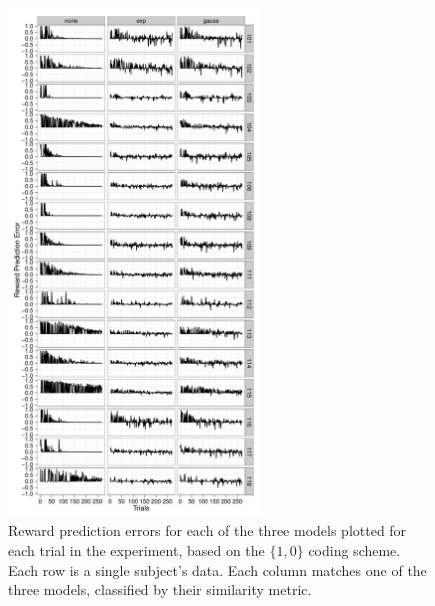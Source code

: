 \begin{figure}[tp]
    \includegraphics[width=0.6\textwidth]{f_rpe_acc}
    \centering
    \caption{Reward prediction errors for each of the three models plotted for each trial in the experiment, based on the $\{1,0\}$ coding scheme.  Each row is a single subject's data.  Each column matches one of the three models, classified by their similarity metric.}
    \label{fig:rpeacc}
\end{figure}
